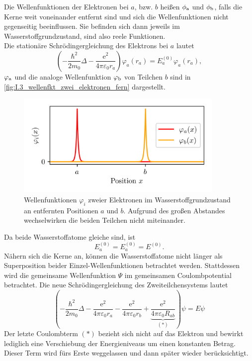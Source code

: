     Die Wellenfunktionen der Elektronen bei $a$, bzw. $b$ heißen $\phi_\text a$ und $\phi_\text b$, falls die Kerne weit voneinander entfernt sind und sich die Wellenfunktionen nicht gegenseitig beeinflussen.
    Sie befinden sich dann jeweils im Wasserstoffgrundzustand, sind also reele Funktionen.\\
    Die stationäre Schrödingergleichung des Elektrons bei $a$ lautet
    \begin{equation}
        \label{eq:3.1}
        \left( - \frac{\hbar ^2}{2m_0} \Delta - \frac{ \mathrm{e}^2}{4 \pi \varepsilon_0 r_{a}} \right) \varphi_{a} \left( r_{a} \right) = E_{a}^{(0)} \varphi_{a}\left( r_{a} \right),
    \end{equation} 
    $\varphi_\text a$ und die analoge Wellenfunktion $\varphi_\text b$ von Teilchen $b$ sind in \autoref{fig:I.3_wellenfkt_zwei_elektronen_fern} dargestellt.\\
    \begin{figure}[H]
        \centering
        \includegraphics[width=10cm]{figures/vl04/wavefn_two_electrons.png}
        \caption{Wellenfunktionen $\varphi_i$ zweier Elektronen im Wasserstoffgrundzustand an entfernten Positionen $a$ und $b$. Aufgrund des großen Abstandes wechselwirken die beiden Teilchen nicht miteinander.}
        \label{fig:I.3_wellenfkt_zwei_elektronen_fern}
    \end{figure}

    Da beide Wasserstoffatome gleiche sind, ist
    \begin{equation}
        \label{eq:3.2}
        E_{a}^{(0)} = E_{a}^{(0)} = E^{(0)}.
    \end{equation}
    Nähern sich die Kerne an, können die Wasserstoffatome nicht länger als Superposition beider Einzel-Wellenfunktionen betrachtet werden.
    Stattdessen wird die gemeinsame Wellenfunktion $\Psi$ im gemeinsamen Coulombpotential betrachtet. Die neue Schrödingergleichung des Zweiteilchensystems lautet
    \begin{equation}
        \label{eq:3.3}
        \left( - \frac{\hbar ^2}{2 m_0} \Delta - \frac{\mathrm{e}^2}{4 \pi \varepsilon_0 r_{a}} -\frac{\mathrm{e}^2}{4 \pi \varepsilon_0 r_{b}} + \underbrace{\frac{\mathrm{e}^2}{4 \pi \varepsilon_0 R_{ab}}}_{(*)} \right) \psi = E \psi
    \end{equation}
    Der letzte Coulombterm $(*)$ bezieht sich  nicht auf das Elektron und bewirkt lediglich eine Verschiebung der Energieniveaus um einen konstanten Betrag. 
    Dieser Term wird fürs Erste weggelassen und dann später wieder berücksichtigt.\\

